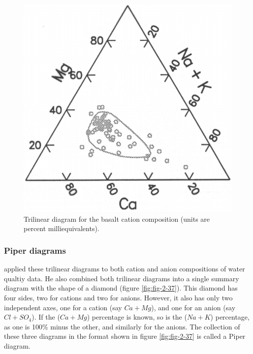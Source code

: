 \documentclass[]{book}
\begin{document}
\begin{figure}

{\centering \includegraphics[width=7.92in]{figures/2_36} 

}

\caption{Trilinear diagram for the basalt cation composition (units are percent milliequivalents).}\label{fig:fig-2-36}
\end{figure}

\hypertarget{piper-diagrams}{%
\subsubsection{Piper diagrams}\label{piper-diagrams}}

\citet{piper_graphic_1944} applied these trilinear diagrams to both cation and anion compositions of water qualtiy data. He also combined both trilinear diagrams into a single summary diagram with the shape of a diamond (figure \ref{fig:fig-2-37}). This diamond has four sides, two for cations and two for anions. However, it also has only two independent axes, one for a cation (say \(Ca + Mg\)), and one for an anion (say \(Cl + SO_{4}\)). If the (\(Ca + Mg\)) percentage is known, so is the (\(Na + K\)) percentage, as one is 100\% minus the other, and similarly for the anions. The collection of these three diagrams in the format shown in figure \ref{fig:fig-2-37} is called a Piper diagram.
\end{document}
